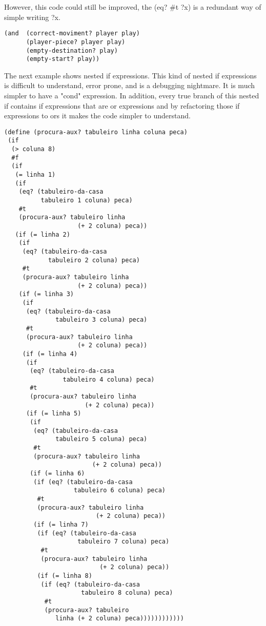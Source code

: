 However, this code could still be improved, the (eq? \#t ?x) is a redundant way
of simple writing ?x.
\begin{lstlisting}[basicstyle=\ttfamily]
(and  (correct-moviment? player play)
      (player-piece? player play)
      (empty-destination? play)
      (empty-start? play))
\end{lstlisting}

The next example shows nested if expressions. This kind of nested if expressions
is difficult to understand, error prone, and is a debugging nightmare.
It is much simpler to have a "cond" expression.
In addition, every true branch of this nested if contains if expressions that are
or expressions and by refactoring those if expressions to ors it makes the code
simpler to understand.
\begin{lstlisting}[basicstyle=\ttfamily]
(define (procura-aux? tabuleiro linha coluna peca)
 (if
  (> coluna 8)
  #f
  (if
   (= linha 1)
   (if
    (eq? (tabuleiro-da-casa
          tabuleiro 1 coluna) peca)
    #t
    (procura-aux? tabuleiro linha
                    (+ 2 coluna) peca))
   (if (= linha 2)
    (if
     (eq? (tabuleiro-da-casa
            tabuleiro 2 coluna) peca)
     #t
     (procura-aux? tabuleiro linha
                    (+ 2 coluna) peca))
    (if (= linha 3)
     (if
      (eq? (tabuleiro-da-casa
              tabuleiro 3 coluna) peca)
      #t
      (procura-aux? tabuleiro linha
                    (+ 2 coluna) peca))
     (if (= linha 4)
      (if
       (eq? (tabuleiro-da-casa
                tabuleiro 4 coluna) peca)
       #t
       (procura-aux? tabuleiro linha
                      (+ 2 coluna) peca))
      (if (= linha 5)
       (if
        (eq? (tabuleiro-da-casa
              tabuleiro 5 coluna) peca)
        #t
        (procura-aux? tabuleiro linha
                        (+ 2 coluna) peca))
       (if (= linha 6)
        (if (eq? (tabuleiro-da-casa
                   tabuleiro 6 coluna) peca)
         #t
         (procura-aux? tabuleiro linha
                         (+ 2 coluna) peca))
        (if (= linha 7)
         (if (eq? (tabuleiro-da-casa
                    tabuleiro 7 coluna) peca)
          #t
          (procura-aux? tabuleiro linha
                          (+ 2 coluna) peca))
         (if (= linha 8)
          (if (eq? (tabuleiro-da-casa
                     tabuleiro 8 coluna) peca)
           #t
           (procura-aux? tabuleiro
              linha (+ 2 coluna) peca))))))))))))
\end{lstlisting}



